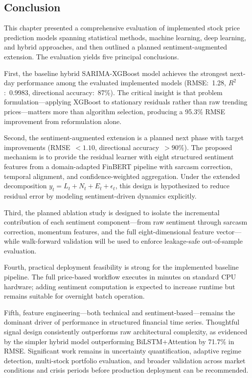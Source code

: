 \subsection{Conclusion}

This chapter presented a comprehensive evaluation of implemented stock price prediction models spanning statistical methods, machine learning, deep learning, and hybrid approaches, and then outlined a planned sentiment-augmented extension. The evaluation yields five principal conclusions.

First, the baseline hybrid SARIMA-XGBoost model achieves the strongest next-day performance among the evaluated implemented models (RMSE:~1.28, $R^2$:~0.9983, directional accuracy:~87\%). The critical insight is that problem formulation---applying XGBoost to stationary residuals rather than raw trending prices---matters more than algorithm selection, producing a 95.3\% RMSE improvement from reformulation alone.

Second, the sentiment-augmented extension is a planned next phase with target improvements (RMSE~$< 1.10$, directional accuracy~$> 90\%$). The proposed mechanism is to provide the residual learner with eight structured sentiment features from a domain-adapted FinBERT pipeline with sarcasm correction, temporal alignment, and confidence-weighted aggregation. Under the extended decomposition $y_t = L_t + N_t + E_t + \epsilon_t$, this design is hypothesized to reduce residual error by modeling sentiment-driven dynamics explicitly.

Third, the planned ablation study is designed to isolate the incremental contribution of each sentiment component---from raw sentiment through sarcasm correction, momentum features, and the full eight-dimensional feature vector---while walk-forward validation will be used to enforce leakage-safe out-of-sample evaluation.

Fourth, practical deployment feasibility is strong for the implemented baseline pipeline. The full price-based workflow executes in minutes on standard CPU hardware; adding sentiment computation is expected to increase runtime but remains suitable for overnight batch operation.

Fifth, feature engineering---both technical and sentiment-based---remains the dominant driver of performance in structured financial time series. Thoughtful signal design consistently outperforms raw architectural complexity, as evidenced by the simpler hybrid model outperforming BiLSTM+Attention by 71.7\% in RMSE. Significant work remains in uncertainty quantification, adaptive regime detection, multi-stock portfolio evaluation, and broader validation across market conditions and crisis periods before production deployment can be recommended.

\newpage
\clearpage


